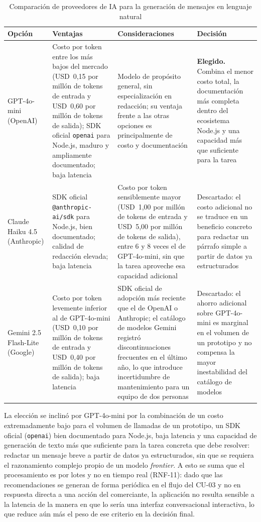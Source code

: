 \begin{table}[h]
\centering
\caption{Comparación de proveedores de IA para la generación de mensajes en lenguaje natural}
\label{tab:comparativo_llm}
\renewcommand{\arraystretch}{1.3}
\begin{tabular}{|m{2.3cm}|m{4.4cm}|m{4.4cm}|m{3.4cm}|}
\hline
\textbf{Opción} & \textbf{Ventajas} & \textbf{Consideraciones} & \textbf{Decisión} \\
\hline
GPT-4o-mini (OpenAI) & Costo por token entre los más bajos del mercado (USD~0,15 por millón de tokens de entrada y USD~0,60 por millón de tokens de salida); SDK oficial \texttt{openai} para Node.js, maduro y ampliamente documentado; baja latencia \parencite{OpenAIPricing2026} & Modelo de propósito general, sin especialización en redacción; su ventaja frente a las otras opciones es principalmente de costo y documentación & \textbf{Elegido.} Combina el menor costo total, la documentación más completa dentro del ecosistema Node.js y una capacidad más que suficiente para la tarea \\
\hline
Claude Haiku 4.5 (Anthropic) & SDK oficial \texttt{@anthropic-ai/sdk} para Node.js, bien documentado; calidad de redacción elevada; baja latencia \parencite{AnthropicPricing2026} & Costo por token sensiblemente mayor (USD~1,00 por millón de tokens de entrada y USD~5,00 por millón de tokens de salida), entre 6 y 8 veces el de GPT-4o-mini, sin que la tarea aproveche esa capacidad adicional & Descartado: el costo adicional no se traduce en un beneficio concreto para redactar un párrafo simple a partir de datos ya estructurados \\
\hline
Gemini 2.5 Flash-Lite (Google) & Costo por token levemente inferior al de GPT-4o-mini (USD~0,10 por millón de tokens de entrada y USD~0,40 por millón de tokens de salida); baja latencia \parencite{GoogleGeminiPricing2026} & SDK oficial de adopción más reciente que el de OpenAI o Anthropic; el catálogo de modelos Gemini registró discontinuaciones frecuentes en el último año, lo que introduce incertidumbre de mantenimiento para un equipo de dos personas & Descartado: el ahorro adicional sobre GPT-4o-mini es marginal en el volumen de un prototipo y no compensa la mayor inestabilidad del catálogo de modelos \\
\hline
\end{tabular}
\end{table}

La elección se inclinó por GPT-4o-mini por la combinación de un costo extremadamente bajo para el volumen de llamadas de un prototipo, un SDK oficial (\texttt{openai}) bien documentado para Node.js, baja latencia y una capacidad de generación de texto más que suficiente para la tarea concreta que debe resolver: redactar un mensaje breve a partir de datos ya estructurados, sin que se requiera el razonamiento complejo propio de un modelo \emph{frontier}. A esto se suma que el procesamiento es por lotes y no en tiempo real (RNF-11): dado que las recomendaciones se generan de forma periódica en el flujo del CU-03 y no en respuesta directa a una acción del comerciante, la aplicación no resulta sensible a la latencia de la manera en que lo sería una interfaz conversacional interactiva, lo que reduce aún más el peso de ese criterio en la decisión final.

